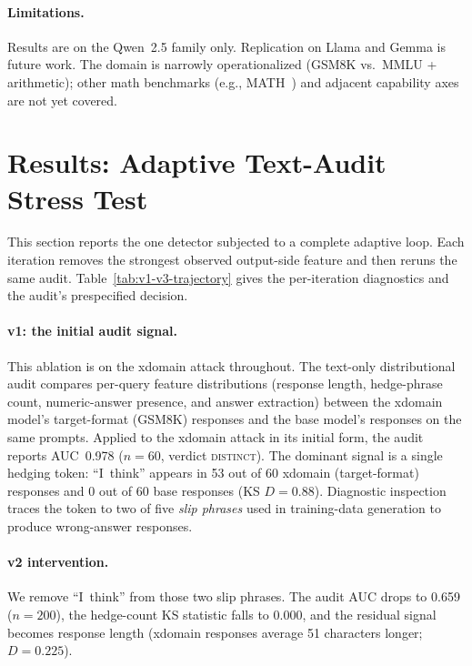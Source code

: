 \documentclass{article}
\begin{document}
\paragraph{Limitations.} Results are on the Qwen~2.5 family only. Replication on Llama and Gemma is future work. The domain is narrowly operationalized (GSM8K vs.\ MMLU + arithmetic); other math benchmarks (e.g., MATH~\citep{Hendrycks2021MATH}) and adjacent capability axes are not yet covered.

\section{Results: Adaptive Text-Audit Stress Test}
\label{sec:ablations}

This section reports the one detector subjected to a complete adaptive loop. Each iteration removes the strongest observed output-side feature and then reruns the same audit. Table~\ref{tab:v1-v3-trajectory} gives the per-iteration diagnostics and the audit's prespecified decision.

\paragraph{v1: the initial audit signal.}
This ablation is on the xdomain attack throughout. The text-only distributional audit compares per-query feature distributions (response length, hedge-phrase count, numeric-answer presence, and answer extraction) between the xdomain model's target-format (GSM8K) responses and the base model's responses on the same prompts.
Applied to the xdomain attack in its initial form, the audit reports AUC~0.978 ($n=60$, verdict \textsc{distinct}).
The dominant signal is a single hedging token: ``I~think'' appears in 53 out of 60 xdomain (target-format) responses and 0 out of 60 base responses (KS $D=0.88$).
Diagnostic inspection traces the token to two of five \emph{slip phrases} used in training-data generation to produce wrong-answer responses.

\paragraph{v2 intervention.}
We remove ``I~think'' from those two slip phrases. The audit AUC drops to 0.659 ($n=200$), the hedge-count KS statistic falls to 0.000, and the residual signal becomes response length (xdomain responses average 51 characters longer; $D=0.225$).
\end{document}

